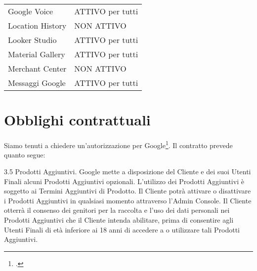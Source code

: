 \begin{center}
\begin{tabular}{ll}
Google Voice&
ATTIVO per tutti\\

Location History&
NON ATTIVO\\

Looker Studio&
ATTIVO per tutti\\

Material Gallery&
ATTIVO per tutti\\

Merchant Center&
NON ATTIVO\\

Messaggi Google&
ATTIVO per tutti\\
\bottomrule
\end{tabular}
\end{center}
\section{Obblighi contrattuali}
Siamo tenuti a chiedere un'autorizzazione per Google\footcite{Google2020}. Il contratto prevede quanto segue:

3.5 Prodotti Aggiuntivi. Google mette a disposizione del Cliente e dei suoi Utenti Finali alcuni Prodotti Aggiuntivi opzionali. L’utilizzo dei Prodotti Aggiuntivi è soggetto ai Termini Aggiuntivi di Prodotto. Il Cliente potrà attivare o disattivare i Prodotti Aggiuntivi in qualsiasi momento attraverso l’Admin Console. Il Cliente otterrà il consenso dei genitori per la raccolta e l’uso dei dati personali nei Prodotti Aggiuntivi che il Cliente intenda abilitare, prima di consentire agli Utenti Finali di età inferiore ai 18 anni di accedere a o utilizzare tali Prodotti Aggiuntivi.
